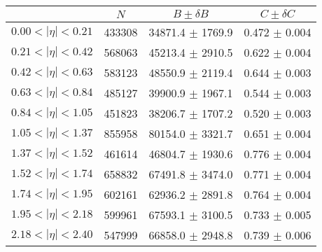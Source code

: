 \begin{tabular}{lccc}
\hline
    &   $N$   & $B \pm \delta B$  &  $C \pm \delta C$ \\
\hline
$0.00 < |\eta| <0.21$          & 433308     & 34871.4    $\pm$ 1769.9 & 0.472      $\pm$ 0.004 \\
$0.21 < |\eta| <0.42$          & 568063     & 45213.4    $\pm$ 2910.5 & 0.622      $\pm$ 0.004 \\
$0.42 < |\eta| <0.63$          & 583123     & 48550.9    $\pm$ 2119.4 & 0.644      $\pm$ 0.003 \\
$0.63 < |\eta| <0.84$          & 485127     & 39900.9    $\pm$ 1967.1 & 0.544      $\pm$ 0.003 \\
$0.84 < |\eta| <1.05$          & 451823     & 38206.7    $\pm$ 1707.2 & 0.520      $\pm$ 0.003 \\
$1.05 < |\eta| <1.37$          & 855958     & 80154.0    $\pm$ 3321.7 & 0.651      $\pm$ 0.004 \\
$1.37 < |\eta| <1.52$          & 461614     & 46804.7    $\pm$ 1930.6 & 0.776      $\pm$ 0.004 \\
$1.52 < |\eta| <1.74$          & 658832     & 67491.8    $\pm$ 3474.0 & 0.771      $\pm$ 0.004 \\
$1.74 < |\eta| <1.95$          & 602161     & 62936.2    $\pm$ 2891.8 & 0.764      $\pm$ 0.004 \\
$1.95 < |\eta| <2.18$          & 599961     & 67593.1    $\pm$ 3100.5 & 0.733      $\pm$ 0.005 \\
$2.18 < |\eta| <2.40$          & 547999     & 66858.0    $\pm$ 2948.8 & 0.739      $\pm$ 0.006 \\
\hline
\end{tabular}
